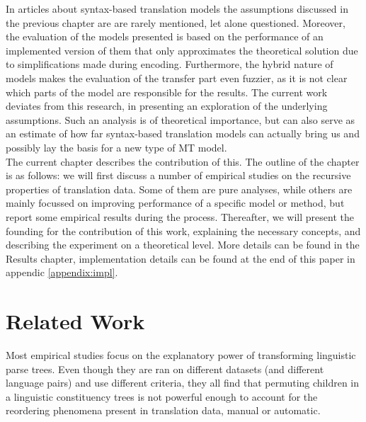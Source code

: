 \documentclass{report}
\theoremstyle{definition}
\theoremstyle{plain}
\begin{document}
In articles about syntax-based translation models the assumptions discussed in the previous chapter are are rarely mentioned, let alone questioned. Moreover, the evaluation of the models presented is based on the performance of an implemented version of them that only approximates the theoretical solution due to simplifications made during encoding. Furthermore, the hybrid nature of models makes the evaluation of the transfer part even fuzzier, as it is not clear which parts of the model are responsible for the results. The current work deviates from this research, in presenting an exploration of the underlying assumptions. Such an analysis is of theoretical importance, but can also serve as an estimate of how far syntax-based translation models can actually bring us and possibly lay the basis for a new type of MT model.\\
The current chapter describes the contribution of this. The outline of the chapter is as follows: we will first discuss a number of empirical studies on the recursive properties of translation data. Some of them are pure analyses, while others are mainly focussed on improving performance of a specific model or method, but report some empirical results during the process. Thereafter, we will present the founding for the contribution of this work, explaining the necessary concepts, and describing the experiment on a theoretical level. More details can be found in the Results chapter, implementation details can be found at the end of this paper in appendic \ref{appendix:impl}.

\section{Related Work}


Most empirical studies focus on the explanatory power of transforming linguistic parse trees. Even though they are ran on different datasets (and different language pairs) and use different criteria, they all find that permuting children in a linguistic constituency trees is not powerful enough to account for the reordering phenomena present in translation data, manual or automatic.
\end{document}
